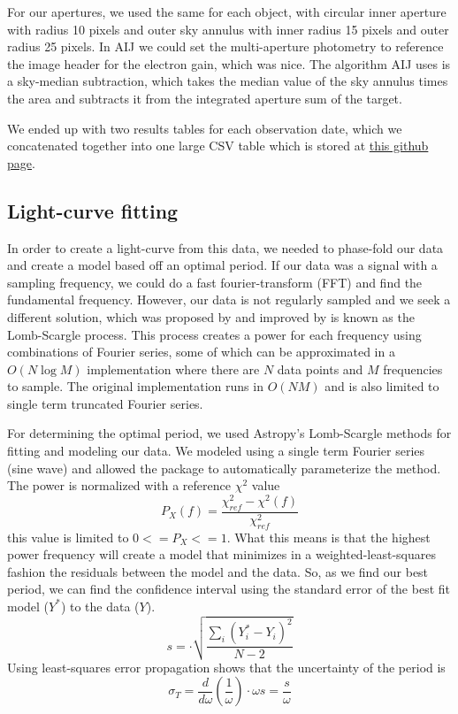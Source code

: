 \documentclass[%
aip,
jmp,
reprint,
floatfix,
nofootinbib
]{revtex4-1}
\begin{document}
	For our apertures, we used the same for each object, with circular inner aperture with radius 10 pixels and outer sky annulus with inner radius 15 pixels and outer radius 25 pixels. In AIJ we could set the multi-aperture photometry to reference the image header for the electron gain, which was nice. The algorithm AIJ uses is a sky-median subtraction, which takes the median value of the sky annulus times the area and subtracts it from the integrated aperture sum of the target.

	We ended up with two results tables for each observation date, which we concatenated together into one large CSV table which is stored at \href{https://github.com/mileslucas/astro344l/blob/master/project/data/full_data.csv}{this github page}.
	
	\subsection{Light-curve fitting}
	
	In order to create a light-curve from this data, we needed to phase-fold our data and create a model based off an optimal period. If our data was a signal with a sampling frequency, we could do a fast fourier-transform (FFT) and find the fundamental frequency. However, our data is not regularly sampled and we seek a different solution, which was proposed by \citet{1976Ap&SS..39..447L} and improved by \citet{1982ApJ...263..835S} is known as the Lomb-Scargle process. This process creates a power for each frequency using combinations of Fourier series, some of which can be approximated in a $O(N \log{M})$ implementation \citep{1989ApJ...338..277P} where there are $N$ data points and $M$ frequencies to sample. The original implementation runs in $O(N M)$ and is also limited to single term truncated Fourier series.	
	
	For determining the optimal period, we used Astropy's Lomb-Scargle methods for fitting and modeling our data. We modeled using a single term Fourier series (sine wave) and allowed the package to automatically parameterize the method. The power is normalized with a reference $\chi^2$ value 
	\begin{equation}
	P_X(f) = \frac{\chi^2_{ref} - \chi^2(f)}{\chi^2_{ref}}
	\end{equation}
	this value is limited to $0<=P_X<=1$. What this means is that the highest power frequency will create a model that minimizes in a weighted-least-squares fashion the residuals between the model and the data. So, as we find our best period, we can find the confidence interval using the standard error of the best fit model ($Y^*$) to the data ($Y$).
	\begin{equation}
	s = \cdot\sqrt{\frac{\sum_i{(Y^*_i-Y_i)^2}}{N-2}}
	\end{equation}
	Using least-squares error propagation shows that the uncertainty of the period is
	\begin{equation}
	\sigma_T = \frac{d}{d \omega}(\frac{1}{\omega})\cdot \omega s = \frac{s}{\omega}
	\end{equation}
	
\end{document}

